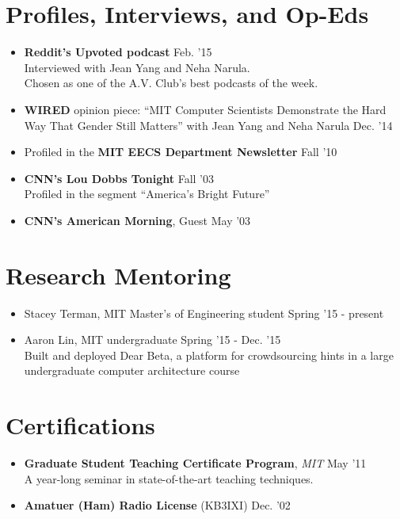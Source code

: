\documentclass[margin]{res}
\begin{document}
\begin{resume}
\section{Profiles, Interviews, and Op-Eds}
\begin{itemize}[leftmargin=*] \itemsep -2pt 
\item {\bf Reddit's Upvoted podcast} \hfill Feb. '15 \\ Interviewed with Jean Yang and Neha Narula.\\
Chosen as one of the A.V. Club's best podcasts of the week.
\item {\bf WIRED} opinion piece: ``MIT Computer Scientists Demonstrate the Hard Way That Gender Still Matters'' with Jean Yang and Neha Narula \hfill Dec. '14
\item Profiled in the {\bf MIT EECS Department Newsletter} \hfill Fall '10
\item \textbf{CNN's Lou Dobbs Tonight}  \hfill Fall '03 \\ Profiled in the segment ``America's Bright Future''
\item \textbf{CNN's American Morning}, Guest \hfill May '03
\end{itemize}





 

\section{Research Mentoring}
\begin{itemize}[leftmargin=*] 
\item Stacey Terman, MIT Master's of Engineering student \hfill Spring '15 - present
\item Aaron Lin, MIT undergraduate \hfill Spring '15 - Dec. '15 \\
Built and deployed Dear Beta, a platform for crowdsourcing hints in a large undergraduate computer architecture course
\end{itemize}

\section{Certifications}
\begin{itemize}[leftmargin=*]
\item {\bf Graduate Student Teaching Certificate Program}, {\it MIT} \hfill May '11 \\ A year-long seminar in state-of-the-art teaching techniques.
\item {\bf Amatuer (Ham) Radio License} (KB3IXI) \hfill Dec. '02
\end{itemize}


\end{resume}
\end{document}
